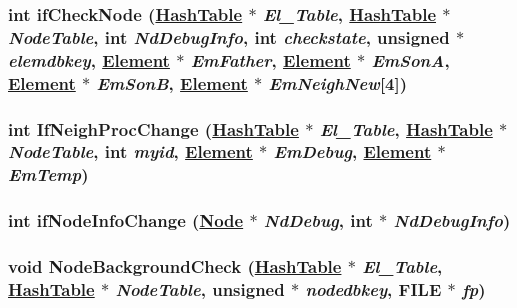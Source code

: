 \hypertarget{updatenei_8C_a6}{
\subsubsection[ifCheckNode]{\setlength{\rightskip}{0pt plus 5cm}int if\-Check\-Node (\hyperlink{classHashTable}{Hash\-Table} $\ast$ {\em El\_\-Table}, \hyperlink{classHashTable}{Hash\-Table} $\ast$ {\em Node\-Table}, int {\em Nd\-Debug\-Info}, int {\em checkstate}, unsigned $\ast$ {\em elemdbkey}, \hyperlink{classElement}{Element} $\ast$ {\em Em\-Father}, \hyperlink{classElement}{Element} $\ast$ {\em Em\-Son\-A}, \hyperlink{classElement}{Element} $\ast$ {\em Em\-Son\-B}, \hyperlink{classElement}{Element} $\ast$ {\em Em\-Neigh\-New}\mbox{[}4\mbox{]})}}
\label{updatenei_8C_a6}


\hypertarget{updatenei_8C_a8}{
\subsubsection[IfNeighProcChange]{\setlength{\rightskip}{0pt plus 5cm}int If\-Neigh\-Proc\-Change (\hyperlink{classHashTable}{Hash\-Table} $\ast$ {\em El\_\-Table}, \hyperlink{classHashTable}{Hash\-Table} $\ast$ {\em Node\-Table}, int {\em myid}, \hyperlink{classElement}{Element} $\ast$ {\em Em\-Debug}, \hyperlink{classElement}{Element} $\ast$ {\em Em\-Temp})}}
\label{updatenei_8C_a8}


\hypertarget{updatenei_8C_a5}{
\subsubsection[ifNodeInfoChange]{\setlength{\rightskip}{0pt plus 5cm}int if\-Node\-Info\-Change (\hyperlink{classNode}{Node} $\ast$ {\em Nd\-Debug}, int $\ast$ {\em Nd\-Debug\-Info})}}
\label{updatenei_8C_a5}


\hypertarget{updatenei_8C_a4}{
\subsubsection[NodeBackgroundCheck]{\setlength{\rightskip}{0pt plus 5cm}void Node\-Background\-Check (\hyperlink{classHashTable}{Hash\-Table} $\ast$ {\em El\_\-Table}, \hyperlink{classHashTable}{Hash\-Table} $\ast$ {\em Node\-Table}, unsigned $\ast$ {\em nodedbkey}, FILE $\ast$ {\em fp})}}
\label{updatenei_8C_a4}


